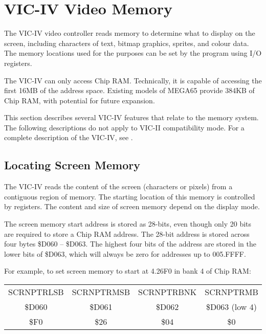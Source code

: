 \newpage
\section{VIC-IV Video Memory}

The VIC-IV video controller reads memory to determine what to display
on the screen, including characters of text, bitmap graphics, sprites, and
colour data. The memory locations used for the purposes can be set by the
program using I/O registers.

The VIC-IV can only access Chip RAM. Technically, it is capable of accessing
the first 16MB of the address space. Existing models of MEGA65 provide 384KB of
Chip RAM, with potential for future expansion.

This section describes several VIC-IV features that relate to the memory
system. The following descriptions do not apply to VIC-II compatibility mode.
For a complete description of the VIC-IV, see .

\subsection{Locating Screen Memory}

The VIC-IV reads the content of the screen (characters or pixels) from a
contiguous region of memory. The starting location of this memory is controlled
by registers. The content and size of screen memory depend on the display mode.

The screen memory start address is stored as 28-bits, even though only 20 bits
are required to store a Chip RAM address. The 28-bit address is stored across
four bytes \$D060 -- \$D063. The highest four bits of the address are stored in
the lower bits of \$D063, which will always be zero for addresses up to 005.FFFF.

For example, to set screen memory to start at 4.26F0 in bank 4 of Chip RAM:

\begin{center}
\begin{tabular}{|c|c|c|c|}
\hline
SCRNPTRLSB & SCRNPTRMSB & SCRNPTRBNK & SCRNPTRMB \\
\$D060 & \$D061 & \$D062 & \$D063 (low 4) \\
\hline
\$F0 & \$26 & \$04 & \$0 \\
\hline
\end{tabular}
\end{center}


